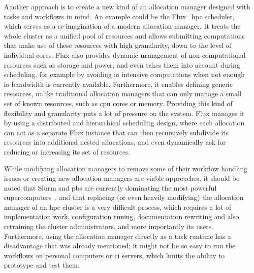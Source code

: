 Another approach is to create a new kind of an allocation manager designed with tasks and workflows
in mind. An example could be the Flux~\cite{flux} \gls{hpc} scheduler,
which serves as a re-imagination of a modern allocation manager. It treats the whole cluster as a
unified pool of resources and allows submitting computations that make use of these resources with
high granularity, down to the level of individual cores. Flux also provides dynamic management of
non-computational resources such as storage and power, and even takes them into account during
scheduling, for example by avoiding \gls{io} intensive computations when not enough
\gls{io} bandwidth is currently available. Furthermore, it enables defining generic
resources, unlike traditional allocation managers that can only manage a small set of known
resources, such as \gls{cpu} cores or memory. Providing this kind of flexibility and
granularity puts a lot of pressure on the system. Flux manages it by using a distributed and
hierarchical scheduling design, where each allocation can act as a separate Flux instance that can
then recursively subdivide its resources into additional nested allocations, and even dynamically
ask for reducing or increasing its set of resources.

While modifying allocation managers to remove some of their workflow handling issues or creating
new allocation managers are viable approaches, it should be noted that Slurm and
\gls{pbs} are currently dominating the most powerful
supercomputers~\cite{slurm-schedmd}, and that replacing (or even heavily modifying) the
allocation manager of an \gls{hpc} cluster is a very difficult process, which
requires a lot of implementation work, configuration tuning, documentation rewriting and also
retraining the cluster administrators, and more importantly its users. Furthermore, using the
allocation manager directly as a task runtime has a disadvantage that was already mentioned; it
might not be so easy to run the workflows on personal computers or \gls{ci} servers,
which limits the ability to prototype and test them.


